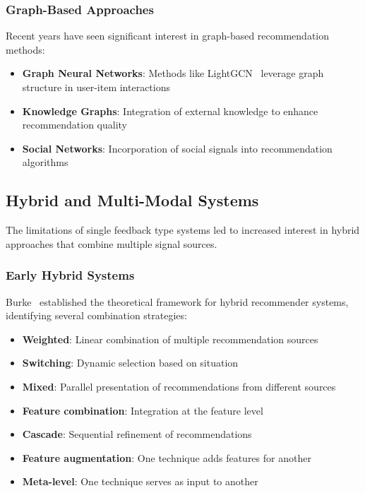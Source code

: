 \subsubsection{Graph-Based Approaches}
Recent years have seen significant interest in graph-based recommendation methods:
\begin{itemize}
    \item \textbf{Graph Neural Networks}: Methods like LightGCN~\cite{he2020lightgcn} leverage graph structure in user-item interactions
    \item \textbf{Knowledge Graphs}: Integration of external knowledge to enhance recommendation quality~\cite{wang2019kgat}
    \item \textbf{Social Networks}: Incorporation of social signals into recommendation algorithms~\cite{ma2011learning}
\end{itemize}

\subsection{Hybrid and Multi-Modal Systems}

The limitations of single feedback type systems led to increased interest in hybrid approaches that combine multiple signal sources.

\subsubsection{Early Hybrid Systems}
Burke~\cite{burke2002hybrid} established the theoretical framework for hybrid recommender systems, identifying several combination strategies:
\begin{itemize}
    \item \textbf{Weighted}: Linear combination of multiple recommendation sources
    \item \textbf{Switching}: Dynamic selection based on situation
    \item \textbf{Mixed}: Parallel presentation of recommendations from different sources
    \item \textbf{Feature combination}: Integration at the feature level
    \item \textbf{Cascade}: Sequential refinement of recommendations
    \item \textbf{Feature augmentation}: One technique adds features for another
    \item \textbf{Meta-level}: One technique serves as input to another
\end{itemize}

